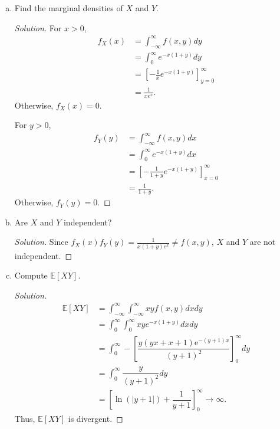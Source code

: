 \documentclass[addpoints, 11pt]{exam}
\newcommand*{\E}{\mathds{E}}
\begin{document}
\begin{enumerate}[(a)]
    \color{crimson}
    \item  Find the marginal densities of $X$ and $Y$.
    \normalcolor
    
    \begin{proof}[Solution]
    For $x > 0$,
        \begin{align*}
            f_X(x) 
            &= \int^{\infty}_{-\infty} f(x, y) dy \\
            &= \int^{\infty}_0 e^{-x(1+y)} dy \\
            &= \left[-\frac{1}{x}e^{-x(1+y)}\right]^{\infty}_{y=0} \\
            &= \frac{1}{xe^{x}}.
        \end{align*}
    Otherwise, $f_X(x) = 0$.

    For $y > 0$,
        \begin{align*}
            f_Y(y) 
            &= \int^{\infty}_{-\infty} f(x, y) dx \\
            &= \int^{\infty}_0 e^{-x(1+y)} dx \\
            &= \left[-\frac{1}{1 + y}e^{-x(1+y)}\right]^{\infty}_{x=0} \\
            &= \frac{1}{1 + y}.
        \end{align*}
    Otherwise, $f_Y(y) = 0$.
    \end{proof}

    \color{crimson}
    \item  Are $X$ and $Y$ independent?
    \normalcolor
    
    \begin{proof}[Solution]
        Since $f_X(x)f_Y(y) = \frac{1}{x(1 + y)e^x} \neq f(x,y)$, $X$ and $Y$ are not independent.
    \end{proof}

    \color{crimson}
    \item   Compute $\E[XY]$.
    \normalcolor
    
    \begin{proof}[Solution]
        \begin{align*}
            \E[XY]
            &= \int^{\infty}_{-\infty}\int^{\infty}_{-\infty} xyf(x, y) dxdy \\
            &= \int^{\infty}_{0}\int^{\infty}_{0} xye^{-x(1+y)} dxdy \\
            &= \int^{\infty}_{0} -\left[\dfrac{y\left(yx+x+1\right)\mathrm{e}^{-\left(y+1\right)x}}{\left(y+1\right)^2}\right]^{\infty}_0 dy \\
            &= \int^{\infty}_{0} \dfrac{y}{\left(y+1\right)^2} dy \\
            &= \left[\ln\left(\left|y+1\right|\right)+\dfrac{1}{y+1}\right]^{\infty}_0 \rightarrow \infty.
        \end{align*}
        Thus, $\E[XY]$ is divergent.
    \end{proof}


\end{enumerate}
\end{document}
